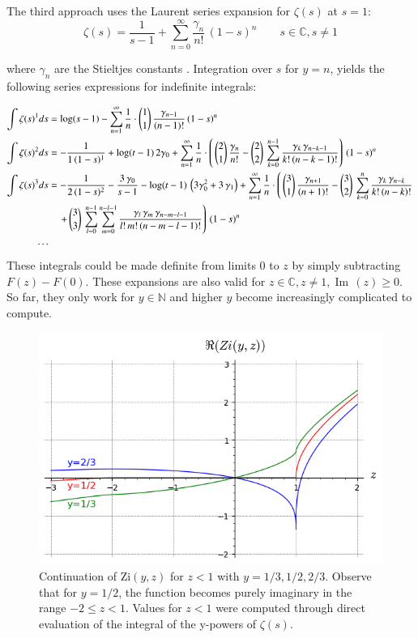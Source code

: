 \documentclass[a4paper,11pt,twoside]{amsart}
\newcommand\Zi{\mathrm{Zi}}
\renewcommand\Im{{\operatorname{Im\,}}}
\begin{document}
The third approach uses the Laurent series expansion for $\zeta(s)$ at $s=1$:
\begin{equation}\label{zetcom8}
  \zeta(s) = \frac{1}{s-1}+\sum_{n=0}^{\infty} \frac{\gamma_n}{n!}\,(1-s)^n \qquad s \in \mathbb{C}, s \ne 1
\end{equation}

where $\gamma_n$ are the Stieltjes constants \cite{stie}. Integration over $s$ for $y = n$, yields the following series expressions for indefinite integrals:

\begin{align}
\int \zeta(s)^{1} ds &= \log(s-1)\- - \sum_{n=1}^{\infty} \frac{1}{n}\cdot \binom{1}{1}\,\frac{\gamma_{n-1}}{(n-1)!}\,(1-s)^n \notag \\
\int \zeta(s)^{2} ds &= -\frac{1}{1\,(1-s)^1}+\log(t-1)\,2\gamma_0 + \sum_{n=1}^{\infty} \frac{1}{n}\cdot \left(\, \binom{2}{1}\,\frac{\gamma_{n}}{n!} -\binom{2}{2}\,\sum_{k=0}^{n-1} \frac{\gamma_k\,\gamma_{n-k-1}}{k!\,(n-k-1)!} \right)\,(1-s)^n \notag \\
\int \zeta(s)^{3} ds &= -\frac{1}{2\,(1-s)^2} - \frac{3\,\gamma_0}{s-1}- \log(t-1)\,\left(3\gamma_0^2+3\,\gamma_1\right) + \sum_{n=1}^{\infty} \frac{1}{n}\cdot \left(\, \binom{3}{1}\,\frac{\gamma_{n+1}}{(n+1)!} -\binom{3}{2}\,\sum_{k=0}^{n} \frac{\gamma_k\,\gamma_{n-k}}{k!\,(n-k)!} \right. \notag \\
& \quad \left. +\, \binom{3}{3}\,\sum_{l=0}^{n-1} \sum_{m=0}^{n-l-1} \frac{\gamma_l\,\gamma_m\,\gamma_{n-m-l-1}}{l!\,m!\,(n-m-l-1)!}  \right)\,(1-s)^n \notag \\
\cdots \notag 
\end{align}
These integrals could be made definite from limits $0$ to $z$ by simply subtracting $F(z) - F(0)$. These expansions are also valid for $z \in \mathbb{C}, z \ne 1, \Im(z) \ge 0$. So far, they only work for $y \in \mathbb{N}$ and higher $y$ become increasingly complicated to compute.

\begin{figure}[H]
  \includegraphics[width=0.9\linewidth]{AncontZizx.png}
  \caption{Continuation of $\Zi(y,z)$ for $z < 1$ with $y=1/3, 1/2, 2/3$. Observe that for $y = 1/2$, the function becomes purely imaginary in the range $-2 \le z < 1$. Values for $z < 1$ were computed through direct evaluation of the integral of the y-powers of $\zeta(s)$.}
\end{figure}
\end{document}
